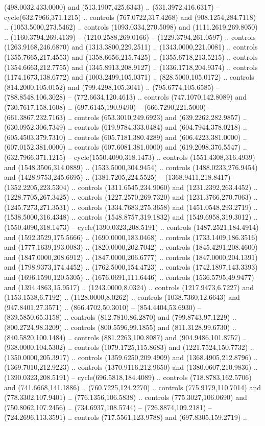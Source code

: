 (498.0032,433.0000) and (513.1907,425.6343) .. (531.3972,416.6317) -- cycle(632.7966,371.1215) .. controls (767.0722,317.4268) and (908.1254,284.7118) .. (1053.5000,273.5462) .. controls (1093.0334,270.5098) and (1111.2619,269.8050) .. (1160.3794,269.4139) -- (1210.2588,269.0166) -- (1229.3794,261.0597) .. controls (1263.9168,246.6870) and (1313.3800,229.2511) .. (1343.0000,221.0081) .. controls (1355.7665,217.4553) and (1358.6656,215.7425) .. (1355.6718,213.5215) .. controls (1354.6663,212.7755) and (1345.8913,208.9127) .. (1336.1718,204.9374) .. controls (1174.1673,138.6772) and (1003.2499,105.0371) .. (828.5000,105.0172) .. controls (814.2000,105.0152) and (799.4298,105.3041) .. (795.6774,105.6585) -- (788.8548,106.3028) -- (772.6634,120.4613) .. controls (747.1070,142.8089) and (730.7617,158.1608) .. (697.6145,190.9490) -- (666.7290,221.5000) -- (661.3867,232.7163) .. controls (653.3010,249.6923) and (639.2262,282.9857) .. (630.0952,306.7349) .. controls (619.9784,333.0484) and (604.7944,378.0218) .. (605.4503,379.7310) .. controls (605.7181,380.4289) and (606.4223,381.0000) .. (607.0152,381.0000) .. controls (607.6081,381.0000) and (619.2098,376.5547) .. (632.7966,371.1215) -- cycle(1550.4090,318.1473) .. controls (1551.4308,316.4939) and (1548.3506,314.0889) .. (1533.5000,304.9454) .. controls (1488.0233,276.9454) and (1428.9753,245.6695) .. (1381.7205,224.5525) -- (1368.9411,218.8417) -- (1352.2205,223.5304) .. controls (1311.6545,234.9060) and (1231.2392,263.4452) .. (1228.7705,267.3425) .. controls (1227.2570,269.7320) and (1231.3766,270.7063) .. (1245.7273,271.3531) .. controls (1334.7683,275.3658) and (1451.0548,293.2719) .. (1538.5000,316.4348) .. controls (1548.8757,319.1832) and (1549.6958,319.3012) .. (1550.4090,318.1473) -- cycle(1390.0323,208.5191) .. controls (1487.2521,184.4914) and (1592.3529,175.5666) .. (1690.0000,183.0468) .. controls (1733.1409,186.3516) and (1777.1639,193.0083) .. (1820.0000,202.7042) .. controls (1845.4291,208.4600) and (1847.0000,208.6912) .. (1847.0000,206.6777) .. controls (1847.0000,204.1391) and (1798.9373,174.4452) .. (1762.5000,154.4723) .. controls (1742.1897,143.3393) and (1696.1590,120.5305) .. (1676.0691,111.6446) .. controls (1536.5795,49.9477) and (1394.4863,15.9517) .. (1243.0000,8.0324) .. controls (1217.9473,6.7227) and (1153.1538,6.7192) .. (1128.0000,8.0262) .. controls (1038.7360,12.6643) and (947.8401,27.3571) .. (866.4702,50.3010) -- (854.4404,53.6930) -- (839.5850,65.3158) .. controls (812.7810,86.2870) and (799.8743,97.1229) .. (800.2724,98.3209) .. controls (800.5596,99.1855) and (811.3128,99.6730) .. (840.5820,100.1484) .. controls (881.2263,100.8087) and (904.9486,101.8757) .. (938.0000,104.5302) .. controls (1079.1725,115.8683) and (1221.7524,150.7732) .. (1350.0000,205.3917) .. controls (1359.6250,209.4909) and (1368.4905,212.8796) .. (1369.7010,212.9223) .. controls (1370.9116,212.9650) and (1380.0607,210.9836) .. (1390.0323,208.5191) -- cycle(696.5818,184.4089) .. controls (718.8783,162.5706) and (741.6668,141.1886) .. (760.7225,124.2270) .. controls (775.9179,110.7014) and (778.3302,107.9401) .. (776.1356,106.5838) .. controls (775.3027,106.0690) and (750.8062,107.2456) .. (734.6937,108.5744) -- (726.8874,109.2181) -- (724.2696,113.3591) .. controls (717.5561,123.9788) and (697.8305,159.2719) .. 